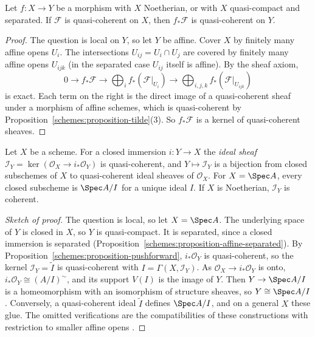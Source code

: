 \begin{proposition}\label{schemes:proposition-pushforward}
Let $f \colon X \to Y$ be a morphism with $X$ Noetherian, or with $X$ quasi-compact and separated. If $\mathcal{F}$ is quasi-coherent on $X$, then $f_*\mathcal{F}$ is
quasi-coherent on $Y$.
\end{proposition}

\begin{proof}
The question is local on $Y$, so let $Y$ be affine. Cover $X$ by finitely many affine opens $U_i$. The intersections $U_{ij} = U_i \cap U_j$ are covered by
finitely many affine opens $U_{ijk}$ (in the separated case $U_{ij}$ itself is affine). By the sheaf axiom,
\[
0 \to f_*\mathcal{F} \to \bigoplus_if_*(\mathcal{F}|_{U_i}) \to \bigoplus_{i,j,k}f_*(\mathcal{F}|_{U_{ijk}})
\]
is exact. Each term on the right is the direct image of a quasi-coherent sheaf under a morphism of affine schemes, which is quasi-coherent by
Proposition~\ref{schemes:proposition-tilde}(3). So $f_*\mathcal{F}$ is a kernel of quasi-coherent sheaves.
\end{proof}

\begin{proposition}\label{schemes:proposition-closed-subschemes}
Let $X$ be a scheme. For a closed immersion $i \colon Y \to X$ the \emph{ideal sheaf} $\mathcal{I}_Y = \ker(\mathcal{O}_X \to i_*\mathcal{O}_Y)$ is quasi-coherent,
and $Y \mapsto \mathcal{I}_Y$ is a bijection from closed subschemes of $X$ to quasi-coherent ideal sheaves of $\mathcal{O}_X$. For $X = \Spec A$, every closed
subscheme is $\Spec A/I$ for a unique ideal $I$. If $X$ is Noetherian, $\mathcal{I}_Y$ is coherent.
\end{proposition}

\begin{proof}[Sketch of proof]
The question is local, so let $X = \Spec A$. The underlying space of $Y$ is closed in $X$, so $Y$ is quasi-compact. It is separated, since a closed immersion is
separated (Proposition~\ref{schemes:proposition-affine-separated}). By Proposition~\ref{schemes:proposition-pushforward}, $i_*\mathcal{O}_Y$ is
quasi-coherent, so the kernel $\mathcal{I}_Y = \widetilde I$ is quasi-coherent with $I = \Gamma(X, \mathcal{I}_Y)$. As $\mathcal{O}_X \to i_*\mathcal{O}_Y$ is onto,
$i_*\mathcal{O}_Y \cong (A/I)^\sim$, and its support $V(I)$ is the image of $Y$. Then $Y \to \Spec A/I$ is a homeomorphism with an isomorphism of structure
sheaves, so $Y \cong \Spec A/I$. Conversely, a quasi-coherent ideal $\widetilde I$ defines $\Spec A/I$, and on a general $X$ these glue. The omitted
verifications are the compatibilities of these constructions with restriction to smaller affine opens \cite[Corollary II.5.10]{hartshorne-ag}.
\end{proof}

